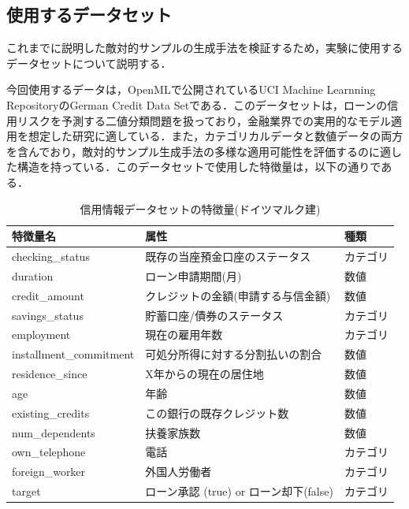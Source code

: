 \subsection{使用するデータセット}
これまでに説明した敵対的サンプルの生成手法を検証するため，実験に使用するデータセットについて説明する．

今回使用するデータは，OpenMLで公開されているUCI Machine Learnning RepositoryのGerman Credit Data Setである．\cite{credit-g}このデータセットは，ローンの信用リスクを予測する二値分類問題を扱っており，金融業界での実用的なモデル適用を想定した研究に適している．また，カテゴリカルデータと数値データの両方を含んでおり，敵対的サンプル生成手法の多様な適用可能性を評価するのに適した構造を持っている．このデータセットで使用した特徴量は，以下の通りである．

\begin{table}[H]
    \centering
    \caption{信用情報データセットの特徴量(ドイツマルク建)}
    \begin{tabular}{|l|l|l|}
        \hline
        特徴量名 & 属性 & 種類 \\ \hline
        checking\_status & 既存の当座預金口座のステータス & カテゴリ \\ \hline
        duration & ローン申請期間(月) & 数値 \\ \hline
        credit\_amount & クレジットの金額(申請する与信金額) & 数値 \\ \hline
        savings\_status & 貯蓄口座/債券のステータス & カテゴリ \\ \hline
        employment & 現在の雇用年数 & カテゴリ \\ \hline
        installment\_commitment & 可処分所得に対する分割払いの割合 & 数値 \\ \hline
        residence\_since & X年からの現在の居住地 & 数値 \\ \hline
        age & 年齢 & 数値 \\ \hline
        existing\_credits & この銀行の既存クレジット数 & 数値 \\ \hline
        num\_dependents & 扶養家族数 & 数値 \\ \hline
        own\_telephone & 電話 & カテゴリ \\ \hline
        foreign\_worker & 外国人労働者 & カテゴリ \\ \hline
        target & ローン承認 (true) or ローン却下(false) & カテゴリ \\ \hline
    \end{tabular}
    \label{tab:credit_g_features}
\end{table}

